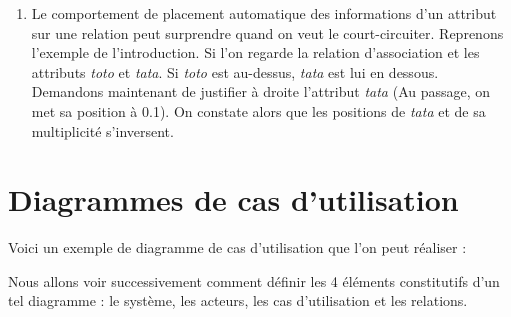 \documentclass[a4paper,11pt]{report}
\newcommand{\inputTikZ}[1]{%
  }%
\newcommand{\inputTikZ}[1]{%
    \texttt{[image: fig/\#1.pdf]}%
  }%
\begin{document}
\begin{enumerate}
\medskip

\begin{minipage}{0.6\textwidth}

\end{minipage}
\begin{minipage}{0.4\textwidth}
\begin{center}
\end{center}
\end{minipage}

\medskip

La solution consiste en une macro proposée par ces options du package babel, qu'il faut utiliser dans le préambule du document :

\medskip

\begin{lstlisting}
\frenchbsetup{AutoSpacePunctuation=false}
\end{lstlisting}

\medskip

\item Le comportement de placement automatique des informations d'un attribut sur une relation peut surprendre quand on veut le court-circuiter. Reprenons l'exemple de l'introduction. Si l'on regarde la relation d'association et les attributs {\it toto} et {\it tata}. Si {\it toto} est au-dessus, {\it tata} est lui en dessous. Demandons maintenant de justifier à droite l'attribut {\it tata} (Au passage, on met sa position à 0.1). On constate alors que les positions de {\it tata} et de sa multiplicité s'inversent.

\begin{center}
\inputTikZ{bugalign}
\end{center}

\end{enumerate}

\chapter{Diagrammes de cas d'utilisation}\label{c.usecase}

Voici un exemple de diagramme de cas d'utilisation que l'on peut réaliser :

\begin{center}
\inputTikZ{usecaseex}
\end{center}

Nous allons voir successivement comment définir les 4 éléments constitutifs d'un tel diagramme : le système, les acteurs, les cas d'utilisation et les relations.
\end{document}
